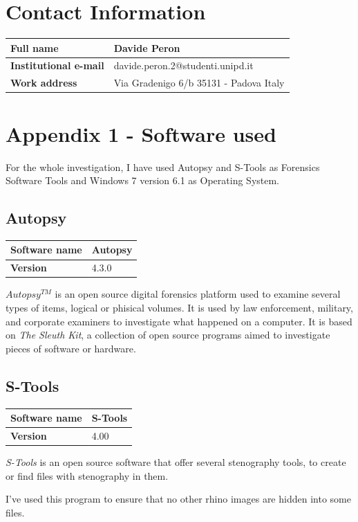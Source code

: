 \documentclass{article}
\begin{document}
\section{Contact Information}

\begin{table}[h!]
	\centering
	\begin{tabular}{l|l}
		\textbf{Full name} & Davide Peron\\
		\hline
		\textbf{Institutional e-mail} & davide.peron.2@studenti.unipd.it\\
		\hline
		\textbf{Work address} & Via Gradenigo 6/b 35131 - Padova Italy\\
	\end{tabular}
	\label{tab:contacts}
\end{table}

\section{Appendix 1 - Software used}

For the whole investigation, I have used Autopsy and S-Tools as Forensics Software Tools and Windows 7 version 6.1 as Operating System.

\subsection{Autopsy}

\begin{table}[h!]
	\centering
	\begin{tabular}{l|l}
		\textbf{Software name} & Autopsy\\
		\hline
		\textbf{Version} & 4.3.0\\
	\end{tabular}
\end{table}

$Autopsy^{TM}$ is an open source digital forensics platform used to examine several types of items, logical or phisical volumes.
It is used by law enforcement, military, and corporate examiners to investigate what happened on a computer. It is based on \textit{The Sleuth Kit}, a collection of open source programs aimed to investigate pieces of software or hardware.

\subsection{S-Tools}

\begin{table}[h!]
	\centering
	\begin{tabular}{l|l}
		\textbf{Software name} & S-Tools\\
		\hline
		\textbf{Version} & 4.00\\
	\end{tabular}
\end{table}

\textit{S-Tools} is an open source software that offer several stenography tools, to create or find files with stenography in them.

I've used this program to ensure that no other rhino images are hidden into some files.
\end{document}
